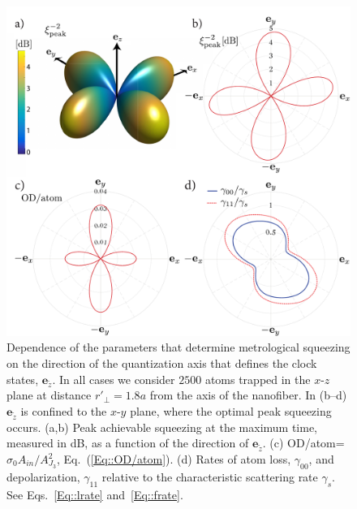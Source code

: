 \documentclass[preprint, aps,pra,onecolumn]{revtex4-1} %
\newcommand{\erf}[1]{Eq.~(\ref{#1})}
\newcommand{\qaxis}{\mathbf{e}_{\tilde{z}}}
\begin{document}
\begin{figure}
\includegraphics[scale=0.37]{./Fig5}
\caption{Dependence of the parameters that determine metrological squeezing  on the direction of the quantization axis that defines the clock states, $\qaxis$.  In all cases we consider $2500$ atoms trapped in the $x$-$z$ plane at distance $ r'\!_\perp=1.8a$ from the axis of the nanofiber. 
In (b--d) $\qaxis$ is confined to the $x$-$y$ plane, where the optimal peak squeezing occurs.
(a,b)  Peak achievable squeezing at the maximum time, measured in dB, as a function of the direction of  $\qaxis$. 
(c) OD/atom=$\sigma_0 A_{in}/A^2_{J_3}$, \erf{Eq::OD/atom}.
(d) Rates of atom loss, $\gamma_{00}$, and depolarization, $\gamma_{11}$ relative to the characteristic scattering rate $\gamma_s$.  See Eqs.~\eqref{Eq::lrate} and~\eqref{Eq::frate}. }\label{Fig::Squeezing_QuantizationAxis}
\end{figure}
\end{document}
